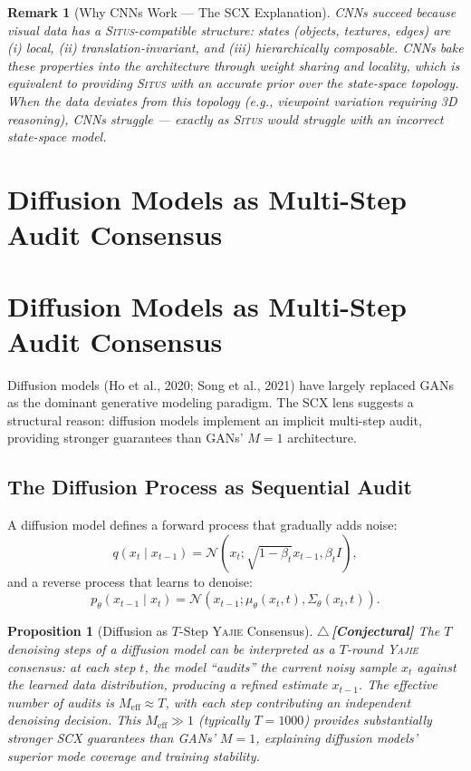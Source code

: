 \documentclass[12pt,a4paper]{article}
\newtheorem{proposition}[theorem]{Proposition}
\newtheorem{remark}[theorem]{Remark}
\theoremstyle{definition}
\newcommand{\rigorConjectural}{{\color{red!70!black}$\triangle$\,\textbf{[Conjectural]}}}
\newcommand{\Situs}{\textsc{Situs}}
\newcommand{\Yajie}{\textsc{Yajie}}
\newcommand{\SCX}{\textsc{SCX}}
\newcommand{\cN}{\mathcal{N}}
\begin{document}
\begin{remark}[Why CNNs Work — The SCX Explanation]
CNNs succeed because visual data has a \Situs{}-compatible structure: states (objects, textures, edges) are (i) local, (ii) translation-invariant, and (iii) hierarchically composable. CNNs bake these properties into the architecture through weight sharing and locality, which is equivalent to providing \Situs{} with an accurate prior over the state-space topology. When the data deviates from this topology (e.g., viewpoint variation requiring 3D reasoning), CNNs struggle — exactly as \Situs{} would struggle with an incorrect state-space model.
\end{remark}

\section{Diffusion Models as Multi-Step Audit Consensus}
\section{Diffusion Models as Multi-Step Audit Consensus}
\label{sec:diffusion}

Diffusion models (Ho et al., 2020; Song et al., 2021) have largely replaced GANs as the dominant generative modeling paradigm. The \SCX{} lens suggests a structural reason: diffusion models implement an implicit multi-step audit, providing stronger guarantees than GANs' $M=1$ architecture.

\subsection{The Diffusion Process as Sequential Audit}

A diffusion model defines a forward process that gradually adds noise:
\begin{equation}\label{eq:diffusion_forward}
    q(x_t \mid x_{t-1}) = \cN(x_t; \sqrt{1-\beta_t} x_{t-1}, \beta_t I),
\end{equation}
and a reverse process that learns to denoise:
\begin{equation}\label{eq:diffusion_reverse}
    p_\theta(x_{t-1} \mid x_t) = \cN(x_{t-1}; \mu_\theta(x_t, t), \Sigma_\theta(x_t, t)).
\end{equation}

\begin{proposition}[Diffusion as $T$-Step \Yajie{} Consensus]\label{prop:diffusion_yajie}
\rigorConjectural
The $T$ denoising steps of a diffusion model can be interpreted as a $T$-round \Yajie{} consensus: at each step $t$, the model ``audits'' the current noisy sample $x_t$ against the learned data distribution, producing a refined estimate $x_{t-1}$. The effective number of audits is $M_{\text{eff}} \approx T$, with each step contributing an independent denoising decision. This $M_{\text{eff}} \gg 1$ (typically $T = 1000$) provides substantially stronger \SCX{} guarantees than GANs' $M=1$, explaining diffusion models' superior mode coverage and training stability.
\end{proposition}
\end{document}
